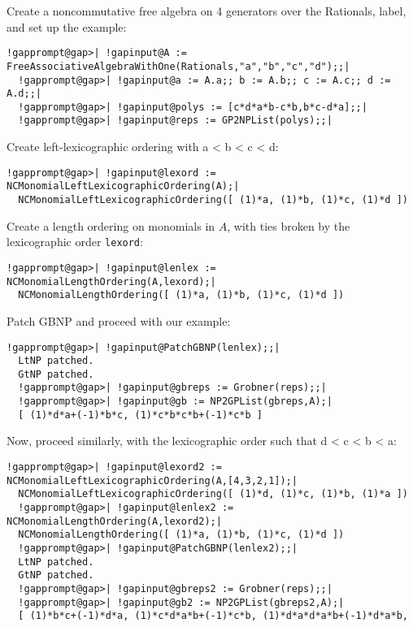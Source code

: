 \documentclass[a4paper,11pt]{report}
\begin{document}
{{{ Create a noncommutative free algebra on 4 generators over the Rationals,
label, and set up the example: 
\begin{Verbatim}[commandchars=!@|,fontsize=\small,frame=single,label=Example]
  !gapprompt@gap>| !gapinput@A := FreeAssociativeAlgebraWithOne(Rationals,"a","b","c","d");;|
  !gapprompt@gap>| !gapinput@a := A.a;; b := A.b;; c := A.c;; d := A.d;;|
  !gapprompt@gap>| !gapinput@polys := [c*d*a*b-c*b,b*c-d*a];;|
  !gapprompt@gap>| !gapinput@reps := GP2NPList(polys);;|
\end{Verbatim}
 Create left-lexicographic ordering with a {\textless} b {\textless} c
{\textless} d: 
\begin{Verbatim}[commandchars=!@|,fontsize=\small,frame=single,label=Example]
  !gapprompt@gap>| !gapinput@lexord := NCMonomialLeftLexicographicOrdering(A);|
  NCMonomialLeftLexicographicOrdering([ (1)*a, (1)*b, (1)*c, (1)*d ])
\end{Verbatim}
 Create a length ordering on monomials in $A$, with ties broken by the lexicographic order \texttt{lexord}: 
\begin{Verbatim}[commandchars=!@|,fontsize=\small,frame=single,label=Example]
  !gapprompt@gap>| !gapinput@lenlex := NCMonomialLengthOrdering(A,lexord);|
  NCMonomialLengthOrdering([ (1)*a, (1)*b, (1)*c, (1)*d ])
\end{Verbatim}
 Patch \textsf{GBNP} and proceed with our example: 
\begin{Verbatim}[commandchars=!@|,fontsize=\small,frame=single,label=Example]
  !gapprompt@gap>| !gapinput@PatchGBNP(lenlex);;|
  LtNP patched.
  GtNP patched.
  !gapprompt@gap>| !gapinput@gbreps := Grobner(reps);;|
  !gapprompt@gap>| !gapinput@gb := NP2GPList(gbreps,A);|
  [ (1)*d*a+(-1)*b*c, (1)*c*b*c*b+(-1)*c*b ]
\end{Verbatim}
 Now, proceed similarly, with the lexicographic order such that d {\textless} c
{\textless} b {\textless} a: 
\begin{Verbatim}[commandchars=!@|,fontsize=\small,frame=single,label=Example]
  !gapprompt@gap>| !gapinput@lexord2 := NCMonomialLeftLexicographicOrdering(A,[4,3,2,1]);|
  NCMonomialLeftLexicographicOrdering([ (1)*d, (1)*c, (1)*b, (1)*a ])
  !gapprompt@gap>| !gapinput@lenlex2 := NCMonomialLengthOrdering(A,lexord2);|
  NCMonomialLengthOrdering([ (1)*a, (1)*b, (1)*c, (1)*d ])
  !gapprompt@gap>| !gapinput@PatchGBNP(lenlex2);;|
  LtNP patched.
  GtNP patched.
  !gapprompt@gap>| !gapinput@gbreps2 := Grobner(reps);;|
  !gapprompt@gap>| !gapinput@gb2 := NP2GPList(gbreps2,A);|
  [ (1)*b*c+(-1)*d*a, (1)*c*d*a*b+(-1)*c*b, (1)*d*a*d*a*b+(-1)*d*a*b,

\end{Verbatim}}}}
\end{document}
